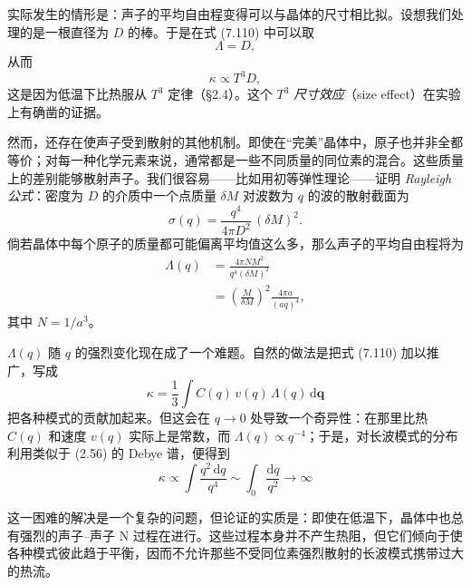 实际发生的情形是：声子的平均自由程变得可以与晶体的尺寸相比拟。设想我们处理的是一根直径为 $D$ 的棒。于是在式 (7.110) 中可以取
\begin{equation*}
\Lambda=D,\tag{7.123}
\end{equation*}
从而
\begin{equation*}
\kappa\propto T^{3}D,\tag{7.124}
\end{equation*}
这是因为低温下比热服从 $T^{3}$ 定律（§2.4）。这个 $T^{3}$ \emph{尺寸效应}（size effect）在实验上有确凿的证据。

然而，还存在使声子受到散射的其他机制。即使在“完美”晶体中，原子也并非全都等价；对每一种化学元素来说，通常都是一些不同质量的同位素的混合。这些质量上的差别能够散射声子。我们很容易——比如用初等弹性理论——证明 \emph{Rayleigh 公式}：密度为 $D$ 的介质中一个点质量 $\delta M$ 对波数为 $q$ 的波的散射截面为
\begin{equation*}
\sigma(q)=\frac{q^{4}}{4\pi D^{2}}\,(\delta M)^{2}.\tag{7.125}
\end{equation*}
倘若晶体中每个原子的质量都可能偏离平均值这么多，那么声子的平均自由程将为
\begin{align*}
\Lambda(q)&=\frac{4\pi NM^{2}}{q^{4}(\delta M)^{2}}\\
&=\left(\frac{M}{\delta M}\right)^{2}\frac{4\pi a}{(aq)^{4}},\tag{7.126}
\end{align*}
其中 $N=1/a^{3}$。

$\Lambda(q)$ 随 $q$ 的强烈变化现在成了一个难题。自然的做法是把式 (7.110) 加以推广，写成
\begin{equation*}
\kappa=\frac{1}{3}\int C(q)\,v(q)\,\Lambda(q)\,\mathrm{d}\mathbf{q}\tag{7.127}
\end{equation*}
把各种模式的贡献加起来。但这会在 $q\to 0$ 处导致一个奇异性：在那里比热 $C(q)$ 和速度 $v(q)$ 实际上是常数，而 $\Lambda(q)\propto q^{-4}$；于是，对长波模式的分布利用类似于 (2.56) 的 Debye 谱，便得到
\begin{equation*}
\kappa\propto\int\frac{q^{2}\,\mathrm{d}q}{q^{4}}\sim\int_{0}\frac{\mathrm{d}q}{q^{2}}\to\infty\tag{7.128}
\end{equation*}

这一困难的解决是一个复杂的问题，但论证的实质是：即使在低温下，晶体中也总有强烈的声子--声子 N 过程在进行。这些过程本身并不产生热阻，但它们倾向于使各种模式彼此趋于平衡，因而不允许那些不受同位素强烈散射的长波模式携带过大的热流。

